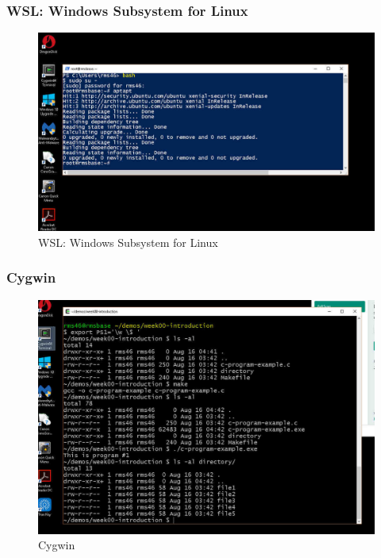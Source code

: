 \documentclass[xcolor=table, notheorems, hyperref={pdfpagelabels=false}]{beamer}
\begin{document}
\begin{frame}
\frametitle{WSL: Windows Subsystem for Linux}
\begin{figure}
\includegraphics[width=0.95\linewidth]{os00-wsl-ubuntu-00}
\caption{WSL: Windows Subsystem for Linux}
\end{figure}
\end{frame}

\begin{frame}
\frametitle{Cygwin}
\begin{figure}
\includegraphics[width=0.85\linewidth]{os00-cygwin-01}
\caption{Cygwin}
\end{figure}
\end{frame}

\end{document}
